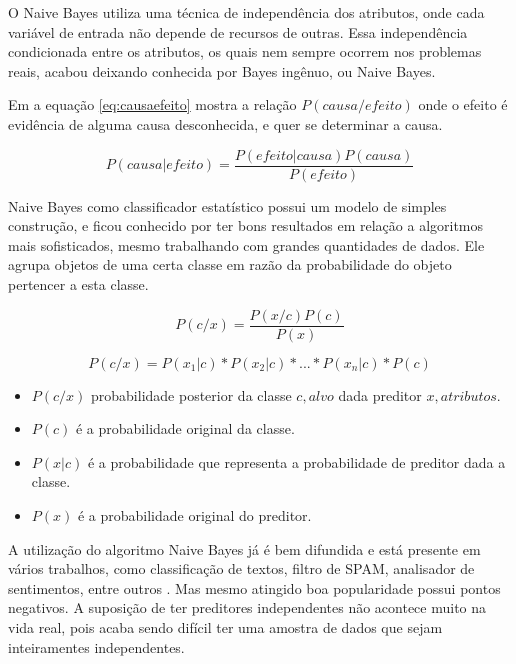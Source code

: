 O Naive Bayes utiliza uma técnica de independência dos atributos, onde cada variável de entrada não depende de recursos de outras. Essa independência condicionada  entre os atributos, os quais nem sempre ocorrem nos problemas reais, acabou deixando conhecida por Bayes ingênuo, ou Naive Bayes.

Em  a equação \ref{eq:causaefeito} mostra a relação ${P(causa/efeito)}$ onde o efeito é evidência de alguma causa desconhecida, e quer se determinar a causa.

\begin{equation} \label{eq:causaefeito}
 P(causa|efeito)= \frac{P(efeito|causa)P(causa)}{P(efeito)}
\end{equation}

Naive Bayes como classificador estatístico possui um modelo de simples construção, e ficou conhecido por ter bons resultados em relação a algoritmos mais sofisticados, mesmo trabalhando com grandes quantidades de dados. Ele agrupa objetos de uma certa classe em razão da probabilidade do objeto pertencer a esta classe. 

\begin{equation}
 P(c/x)= \frac{P(x/c)P(c)}{P(x)}
\end{equation}

\begin{equation}
 P(c/x)=P(x_1|c)*P(x_2|c)*...*P(x_n|c)*P(c)
 \label{eq:bayes}
\end{equation}


\begin{itemize}
 \item ${P(c/x)}$ probabilidade posterior da classe ${c,alvo}$ dada preditor ${x,atributos}$.
 \item ${P(c)}$  é a probabilidade original da classe.
 \item ${P(x|c)}$  é a probabilidade que representa a probabilidade de preditor dada a classe.
 \item ${P(x)}$  é a probabilidade original do preditor.
\end{itemize}

A utilização do algoritmo Naive Bayes já é bem difundida e está presente em vários trabalhos, como classificação de textos, filtro de SPAM, analisador de sentimentos, entre outros . Mas mesmo atingido boa popularidade possui pontos negativos. A suposição de ter preditores independentes não acontece muito na vida real, pois acaba sendo difícil ter uma amostra de dados que sejam inteiramentes independentes. 


